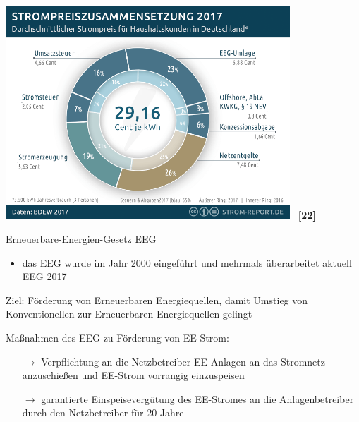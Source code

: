 \documentclass[aspectratio=1610, professionalfonts, 9pt]{beamer}
\begin{document}
{
\begin{frame}
  \centering
  \includegraphics[width=0.8\textwidth]{images/strompreis-zusammensetzung.png} \ \textbf{\textcolor{tugreen}{[22]}}
\end{frame}
}


\begin{frame}{Erneuerbare-Energien-Gesetz EEG}
   \begin{itemize}
     \item das EEG wurde im Jahr 2000 eingeführt und mehrmals überarbeitet aktuell EEG 2017
   \end{itemize}
    \begin{block}{Ziel:}
      Förderung von Erneuerbaren Energiequellen, damit Umstieg von Konventionellen zur Erneuerbaren Energiequellen gelingt
    \end{block}
    \begin{block}{Maßnahmen des EEG zu Förderung von EE-Strom:}
     \begin{itemize}
       \item[$\rightarrow$] Verpflichtung an die Netzbetreiber EE-Anlagen an das Stromnetz anzuschießen und EE-Strom vorrangig einzuspeisen
       \item[$\rightarrow$] garantierte Einspeisevergütung des EE-Stromes an die Anlagenbetreiber durch den Netzbetreiber für 20 Jahre
   \end{itemize}
   \end{block}
\end{frame}
\end{document}
